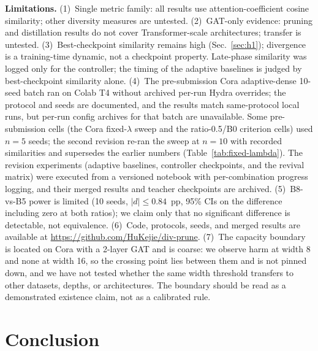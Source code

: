 \documentclass{ws-ijprai}
\begin{document}
\noindent\textbf{Limitations.} (1)~Single metric family: all results use
attention-coefficient cosine similarity; other diversity measures are untested.
(2)~GAT-only evidence: pruning and distillation results do not cover
Transformer-scale architectures; transfer is untested. (3)~Best-checkpoint
similarity remains high (Sec.~\ref{sec:h1}); divergence is a training-time
dynamic, not a checkpoint property. Late-phase similarity was logged only for
the controller; the timing of the adaptive baselines is judged by
best-checkpoint similarity alone. (4)~The pre-submission Cora adaptive-dense
10-seed batch ran on Colab T4 without archived per-run Hydra overrides; the
protocol and seeds are documented, and the results match same-protocol local
runs, but per-run config archives for that batch are unavailable. Some
pre-submission cells (the Cora fixed-$\lambda$ sweep and the ratio-0.5/B0
criterion cells) used $n=5$ seeds; the second revision re-ran the sweep at
$n=10$ with recorded similarities and supersedes the earlier numbers
(Table~\ref{tab:fixed-lambda}). The revision experiments (adaptive baselines,
controller checkpoints, and the revival matrix) were executed from a
versioned notebook with per-combination progress logging, and their merged
results and teacher checkpoints are archived.
(5)~B8-vs-B5 power is limited (10 seeds, $|d| \le 0.84$~pp, 95\% CIs on the
difference including zero at both ratios); we claim only that no significant
difference is detectable, not equivalence. (6)~Code, protocols, seeds, and
merged results are available at \url{https://github.com/HuKejie/div-prune}.
(7)~The capacity boundary is located on Cora with a 2-layer GAT and is coarse:
we observe harm at width 8 and none at width 16, so the crossing point lies
between them and is not pinned down, and we have not tested whether the same
width threshold transfers to other datasets, depths, or architectures. The
boundary should be read as a demonstrated existence claim, not as a calibrated
rule.

\section{Conclusion}
\end{document}
